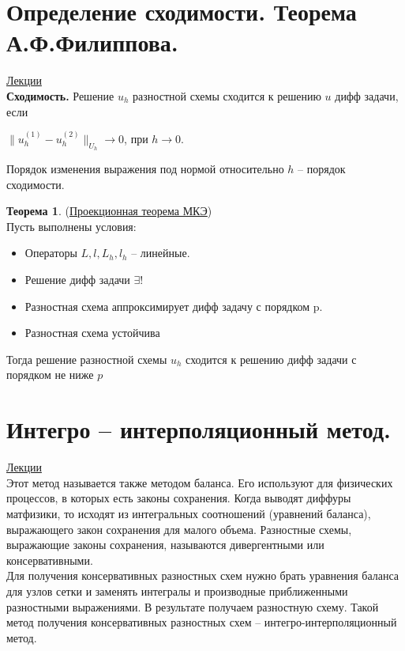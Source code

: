 \documentclass[specialist, subf, href, colorlinks=true, 12pt, times, mtpro, final]{disser}
\theoremstyle{definition}
\newtheorem{theorem}{Теорема}[section]
\begin{document}
{\section {Определение сходимости. Теорема А.Ф.Филиппова.}
    \hyperlink {lects.120}{Лекции}\\
    \textbf{Сходимость.} Решение $u_h$ разностной схемы сходится к решению $u$ дифф задачи, если
    \begin{center}
    	$\|u_h^{(1)} - u_h^{(2)}\| _{U_h} \rightarrow 0$, при $h\rightarrow 0$.\\
    \end{center}
    Порядок изменения выражения под нормой относительно $h$ -- порядок сходимости.
    \begin{theorem} (\hyperlink {lects.120}{Проекционная теорема МКЭ})\\
    	Пусть выполнены условия:
    	\begin{itemize}
    		\item Операторы $L, l, L_h, l_h$ -- линейные.
    		\item Решение дифф задачи $\exists !$
    		\item Разностная схема аппроксимирует дифф задачу с порядком p.
    		\item Разностная схема устойчива
    	\end{itemize}
    	Тогда решение разностной схемы $u_h$ сходится к решению дифф задачи с порядком не ниже $p$
    \end{theorem}

\section {Интегро -- интерполяционный метод.}
    \hyperlink {lects.121}{Лекции}\\
    Этот метод называется также методом баланса. Его используют для физических процессов, в которых есть законы сохранения. Когда выводят диффуры матфизики, то исходят из интегральных соотношений (уравнений баланса), выражающего закон сохранения для малого объема. Разностные схемы, выражающие законы сохранения, называются дивергентными или консервативными.\\
    Для получения консервативных разностных схем нужно брать уравнения баланса для узлов сетки и заменять интегралы и производные приближенными разностными выражениями. В результате получаем разностную схему. Такой метод получения консервативных разностных схем -- интегро-интерполяционный метод.

}
\end{document}
